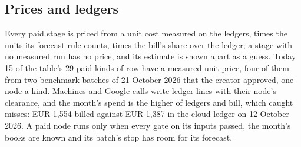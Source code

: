 \begin{center}\end{center}

\subsection{Prices and ledgers}\label{prices-and-ledgers}

Every paid stage is priced from a unit cost measured on the ledgers, times the units its forecast rule counts, times the bill's share over the ledger; a stage with no measured run has no price, and its estimate is shown apart as a guess. Today 15 of the table's 29 paid kinds of row have a measured unit price, four of them from two benchmark batches of 21 October 2026 that the creator approved, one node a kind. Machines and Google calls write ledger lines with their node's clearance, and the month's spend is the higher of ledgers and bill, which caught misses: EUR 1,554 billed against EUR 1,387 in the cloud ledger on 12 October 2026. A paid node runs only when every gate on its inputs passed, the month's books are known and its batch's stop has room for its forecast.
